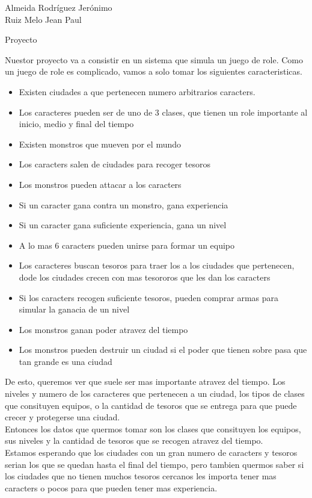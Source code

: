 \documentclass[a4paper, 12pt]{report}
\begin{document}
\begin{flushright}
    Almeida Rodríguez Jerónimo\\
    Ruiz Melo Jean Paul
\end{flushright}

\begin{center}
    {\LARGE Proyecto}\\
\end{center}
Nuestor proyecto va a consistir en un sistema que simula un juego de role.
Como un juego de role es complicado, vamos a solo tomar los siguientes
caracteristicas. 
\begin{itemize}
    \item Existen ciudades a que pertenecen numero 
    arbitrarios caracters.
    \item Los caracteres pueden ser de uno de 3 clases, que
    tienen un role importante al inicio, medio y final del
    tiempo
    \item Existen monstros que mueven por el mundo
    \item Los caracters salen de ciudades para recoger tesoros
    \item Los monstros pueden attacar a los caracters
    \item Si un caracter gana contra un monstro, gana
    experiencia
    \item Si un caracter gana suficiente experiencia, gana un nivel
    \item A lo mas 6 caracters pueden unirse para formar un equipo
    \item Los caracteres buscan tesoros para traer los a los
    ciudades que pertenecen, dode los ciudades crecen con mas
    tesororos que les dan los caracters
    \item Si los caracters recogen suficiente tesoros, pueden
    comprar armas para simular la ganacia de un nivel
    \item Los monstros ganan poder atravez del tiempo
    \item Los monstros pueden destruir un ciudad si el
    poder que tienen sobre pasa que tan grande es una ciudad
\end{itemize}
De esto, queremos ver que suele ser mas importante atravez del tiempo.
Los niveles y numero de los caracteres que pertenecen a un ciudad, los
tipos de clases que consituyen equipos, o la cantidad de tesoros que
se entrega para que puede crecer y protegerse una ciudad. \\

Entonces los datos que quermos tomar son los clases que
consituyen los equipos, sus niveles y la cantidad de tesoros
que se recogen atravez del tiempo. \\

Estamos esperando que los ciudades con un gran numero de
caracters y tesoros serian los que se quedan hasta el final
del tiempo, pero tambien quermos saber si los ciudades
que no tienen muchos tesoros cercanos les importa tener mas
caracters o pocos para que pueden tener mas experiencia.
\end{document}
